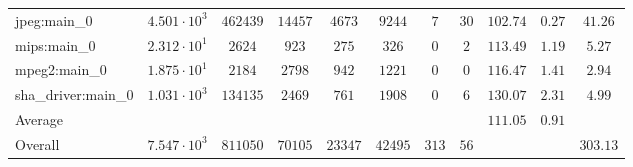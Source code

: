 \begin{tabular}{|l|c|c|c|c|c|c|c|c|c|c|}
jpeg:main\_0            & $ 4.501 \cdot 10^{3}  $ & $ 462439 $ & $ 14457 $ & $ 4673  $ & $ 9244  $ & $ 7   $ & $ 30 $ & $ 102.74      $ & $ 0.27    $ & $ 41.26   $ \\
mips:main\_0            & $ 2.312 \cdot 10^{1}  $ & $ 2624   $ & $ 923   $ & $ 275   $ & $ 326   $ & $ 0   $ & $ 2  $ & $ 113.49      $ & $ 1.19    $ & $ 5.27    $ \\
mpeg2:main\_0           & $ 1.875 \cdot 10^{1}  $ & $ 2184   $ & $ 2798  $ & $ 942   $ & $ 1221  $ & $ 0   $ & $ 0  $ & $ 116.47      $ & $ 1.41    $ & $ 2.94    $ \\
sha\_driver:main\_0     & $ 1.031 \cdot 10^{3}  $ & $ 134135 $ & $ 2469  $ & $ 761   $ & $ 1908  $ & $ 0   $ & $ 6  $ & $ 130.07      $ & $ 2.31    $ & $ 4.99    $ \\
\hline
Average                 & $                     $ & $        $ & $       $ & $       $ & $       $ & $     $ & $    $ & $ 111.05      $ & $ 0.91    $ & $         $ \\
\hline
Overall                 & $ 7.547 \cdot 10^{3}  $ & $ 811050 $ & $ 70105 $ & $ 23347 $ & $ 42495 $ & $ 313 $ & $ 56 $ & $             $ & $         $ & $ 303.13  $ \\
\hline
\end{tabular}
